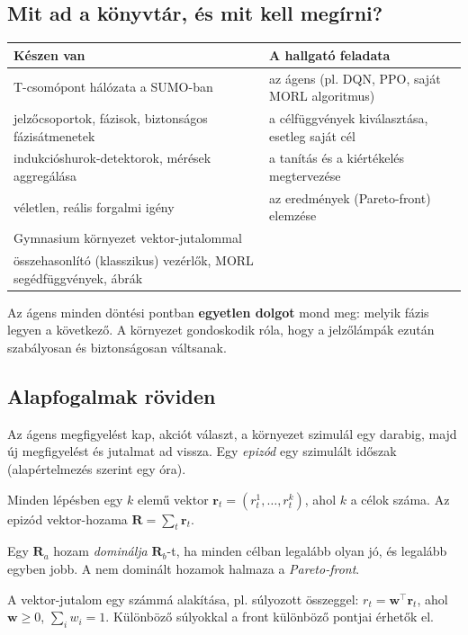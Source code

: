 \documentclass[11pt,a4paper]{article}
\begin{document}
\subsection{Mit ad a könyvtár, és mit kell megírni?}

\begin{center}
\begin{tabularx}{\linewidth}{@{}>{\raggedright\arraybackslash}X>{\raggedright\arraybackslash}X@{}}
\toprule
\textbf{Készen van} & \textbf{A hallgató feladata} \\
\midrule
T-csomópont hálózata a SUMO-ban & az ágens (pl. DQN, PPO, saját MORL algoritmus) \\
jelzőcsoportok, fázisok, biztonságos fázisátmenetek & a célfüggvények kiválasztása, esetleg saját cél \\
indukcióshurok-detektorok, mérések aggregálása & a tanítás és a kiértékelés megtervezése \\
véletlen, reális forgalmi igény & az eredmények (Pareto-front) elemzése \\
Gymnasium környezet vektor-jutalommal & \\
összehasonlító (klasszikus) vezérlők, MORL segédfüggvények, ábrák & \\
\bottomrule
\end{tabularx}
\end{center}

Az ágens minden döntési pontban \textbf{egyetlen dolgot} mond meg: melyik fázis legyen a
következő. A környezet gondoskodik róla, hogy a jelzőlámpák ezután szabályosan és biztonságosan
váltsanak.

\subsection{Alapfogalmak röviden}

\begin{description}[style=nextline,leftmargin=1.5em]
  \item[Ágens, környezet, lépés] Az ágens megfigyelést kap, akciót választ, a környezet szimulál egy
    darabig, majd új megfigyelést és jutalmat ad vissza. Egy \emph{epizód} egy szimulált időszak
    (alapértelmezés szerint egy óra).
  \item[Vektor-jutalom] Minden lépésben egy $k$ elemű vektor $\mathbf r_t = (r^1_t,\dots,r^k_t)$,
    ahol $k$ a célok száma. Az epizód vektor-hozama $\mathbf R = \sum_t \mathbf r_t$.
  \item[Dominancia, Pareto-front] Egy $\mathbf R_a$ hozam \emph{dominálja} $\mathbf R_b$-t, ha minden
    célban legalább olyan jó, és legalább egyben jobb. A nem dominált hozamok halmaza a
    \emph{Pareto-front}.
  \item[Skalarizálás] A vektor-jutalom egy számmá alakítása, pl. súlyozott összeggel:
    $r_t = \mathbf w^\top \mathbf r_t$, ahol $\mathbf w \geq 0$, $\sum_i w_i = 1$. Különböző súlyokkal
    a front különböző pontjai érhetők el.
\end{description}
\end{document}
